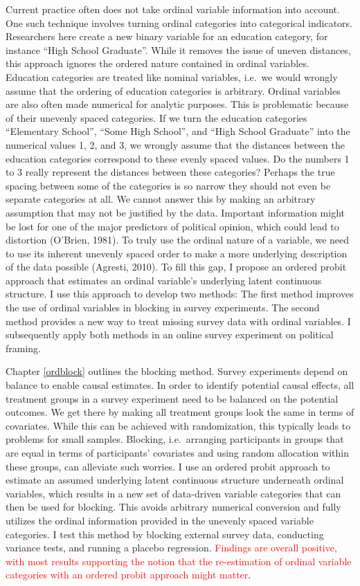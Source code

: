 \documentclass[12pt,econ]{sources/authesis}
\begin{document}
Current practice often does not take ordinal variable information into account. One such technique involves turning ordinal categories into categorical indicators. Researchers here create a new binary variable for an education category, for instance ``High School Graduate''. While it removes the issue of uneven distances, this approach ignores the ordered nature contained in ordinal variables. Education categories are treated like nominal variables, i.e.~we would wrongly assume that the ordering of education categories is arbitrary. Ordinal variables are also often made numerical for analytic purposes. This is problematic because of their unevenly spaced categories. If we turn the education categories ``Elementary School'', ``Some High School'', and ``High School Graduate'' into the numerical values 1, 2, and 3, we wrongly assume that the distances between the education categories correspond to these evenly spaced values. Do the numbers 1 to 3 really represent the distances between these categories? Perhaps the true spacing between some of the categories is so narrow they should not even be separate categories at all. We cannot answer this by making an arbitrary assumption that may not be justified by the data. Important information might be lost for one of the major predictors of political opinion, which could lead to distortion (O'Brien, 1981). To truly use the ordinal nature of a variable, we need to use its inherent unevenly spaced order to make a more underlying description of the data possible (Agresti, 2010). To fill this gap, I propose an ordered probit approach that estimates an ordinal variable's underlying latent continuous structure. I use this approach to develop two methods: The first method improves the use of ordinal variables in blocking in survey experiments. The second method provides a new way to treat missing survey data with ordinal variables. I subsequently apply both methods in an online survey experiment on political framing.

Chapter \ref{ordblock} outlines the blocking method. Survey experiments depend on balance to enable causal estimates. In order to identify potential causal effects, all treatment groups in a survey experiment need to be balanced on the potential outcomes. We get there by making all treatment groups look the same in terms of covariates. While this can be achieved with randomization, this typically leads to problems for small samples. Blocking, i.e.~arranging participants in groups that are equal in terms of participants' covariates and using random allocation within these groups, can alleviate such worries. I use an ordered probit approach to estimate an assumed underlying latent continuous structure underneath ordinal variables, which results in a new set of data-driven variable categories that can then be used for blocking. This avoids arbitrary numerical conversion and fully utilizes the ordinal information provided in the unevenly spaced variable categories. I test this method by blocking external survey data, conducting variance tests, and running a placebo regression. \textcolor{red}{Findings are overall positive, with most results supporting the notion that the re-estimation of ordinal variable categories with an ordered probit approach might matter}.
\end{document}
